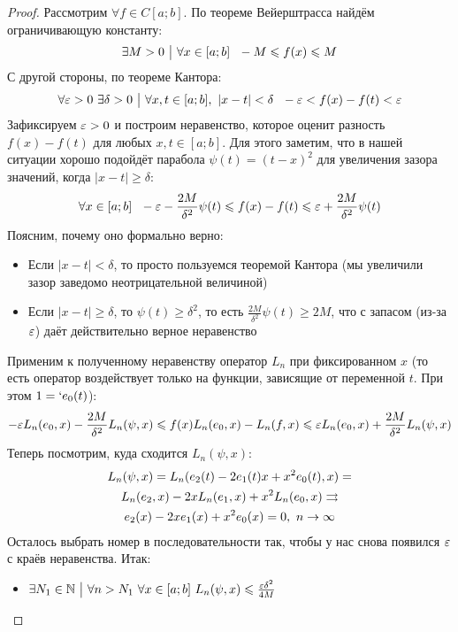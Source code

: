\begin{proof}
	Рассмотрим $\forall f \in C[a; b]$. По теореме Вейерштрасса найдём ограничивающую константу:
	\[
		\exists M > 0 \ \big|\  \forall x \in [a; b]\ \ -M \leqslant f(x) \leqslant M
	\]
	С другой стороны, по теореме Кантора:
	\[
		\forall \varepsilon > 0\ \exists \delta > 0 \ \big|\  \forall x, t \in [a; b],\ |x - t| < \delta\ \ -\varepsilon < f(x) - f(t) < \varepsilon
	\]
	Зафиксируем $\varepsilon > 0$ и построим неравенство, которое оценит разность $f(x) - f(t)$ для любых $x, t \in [a; b]$. Для этого заметим, что в нашей ситуации хорошо подойдёт парабола $\psi(t) = (t - x)^2$ для увеличения зазора значений, когда $|x - t| \ge \delta$:
	\[
		\forall x \in [a; b]\ \ -\varepsilon - \frac{2M}{\delta^2} \psi(t) \leqslant f(x) - f(t) \leqslant \varepsilon + \frac{2M}{\delta^2}\psi(t)
	\]
	Поясним, почему оно формально верно:
	\begin{itemize}
		\item Если $|x - t| < \delta$, то просто пользуемся теоремой Кантора (мы увеличили зазор заведомо неотрицательной величиной)
		
		\item Если $|x - t| \ge \delta$, то $\psi(t) \ge \delta^2$, то есть $\frac{2M}{\delta^2}\psi(t) \ge 2M$, что с запасом (из-за $\varepsilon$) даёт действительно верное неравенство
	\end{itemize}
	Применим к полученному неравенству оператор $L_n$ при фиксированном $x$ (то есть оператор воздействует только на функции, зависящие от переменной $t$. При этом $1 = `e_0(t)$):
	\[
		-\varepsilon L_n(e_0, x) - \frac{2M}{\delta^2}L_n(\psi, x) \leqslant f(x)L_n(e_0, x) - L_n(f, x) \leqslant \varepsilon L_n(e_0, x) + \frac{2M}{\delta^2}L_n(\psi, x)
	\]
	Теперь посмотрим, куда сходится $L_n(\psi, x)$:
	\begin{multline*}
		L_n(\psi, x) = L_n(e_2(t) - 2e_1(t)x + x^2e_0(t), x) =
		\\
		L_n(e_2, x) - 2xL_n(e_1, x) + x^2 L_n(e_0, x) \rightrightarrows
		\\
		e_2(x) - 2xe_1(x) +x^2e_0(x) = 0,\ n \to \infty
	\end{multline*}
	Осталось выбрать номер в последовательности так, чтобы у нас снова появился $\varepsilon$ с краёв неравенства. Итак:
	\begin{itemize}
		\item $\exists N_1 \in \mathbb{N} \ \big|\  \forall n > N_1\ \forall x \in [a; b]\ L_n(\psi, x) \leqslant \frac{\varepsilon\delta^2}{4M}$
		

\end{itemize}
\end{proof}
